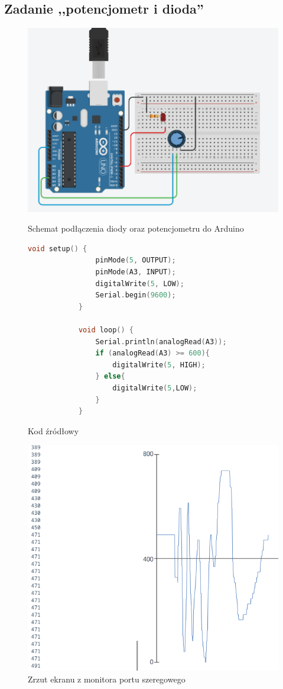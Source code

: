 \documentclass[polish,a4paper]{article}
\begin{document}
	\subsection{Zadanie ,,potencjometr i dioda''}
	\begin{figure}[h!]
		\begin{center}
			\includegraphics[scale=0.4]{03_serial_conn.png}
			\caption*{Schemat podłączenia diody oraz potencjometru do Arduino}
		\end{center}
		\begin{lstlisting}[language=C++]
			void setup() {
				pinMode(5, OUTPUT);
				pinMode(A3, INPUT);
				digitalWrite(5, LOW);
				Serial.begin(9600);
			}

			void loop() {
				Serial.println(analogRead(A3));
				if (analogRead(A3) >= 600){
					digitalWrite(5, HIGH);
				} else{
					digitalWrite(5,LOW);
				}
			}
		\end{lstlisting}
		\caption*{Kod źródłowy}
		\begin{center}
			\includegraphics[scale=0.45]{Serial.png}
			\caption*{Zrzut ekranu z monitora portu szeregowego}
		\end{center}
	\end{figure}
\end{document}

